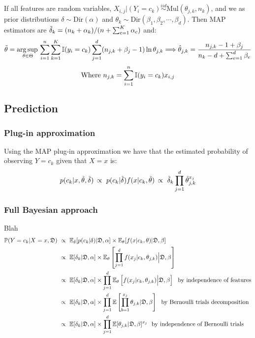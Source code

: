 If all features are  random variables, $X_{i,j}|(Y_i=c_k)\overset{iid}{\sim}\text{Mul}(\theta_{j,k},n_k)$, and we as prior distributions $\delta\sim\text{Dir}(\alpha)$ and $\theta_k\sim\text{Dir}(\beta_1,\beta_2,\cdots,\beta_d)$. Then MAP estimators are $\Tilde{\delta}_k = (n_k+\alpha_k)/(n+\sum_{c=1}^K\alpha_c)$ and:
\begin{equation*}
    \Tilde{\theta} = \operatorname*{arg\,sup\,}_{\theta\in\Theta}  \sum_{i=1}^n\sum_{k=1}^K\operatorname{\mathbb{I}}(y_i=c_k)\sum_{j=1}^d(n_{j,k}+\beta_j-1)\ln \theta_{j,k} \Longrightarrow \hat{\theta}_{j,k} = \frac{n_{j,k}-1+\beta_j}{n_k-d+\sum_{e=1}^d\beta_e}
\end{equation*}
\begin{equation*}
    \text{Where } n_{j,k}=\sum_{i=1}^n\operatorname{\mathbb{I}}(y_i=c_k)x_{i,j}
\end{equation*}

\subsection{Prediction}

\subsubsection*{Plug-in approximation}
Using the MAP plug-in approximation we have that the estimated probability of observing $Y=c_k$ given that $X=x$ is:
\begin{equation*}
    p(c_k|x, \Tilde{\theta},\Tilde{\delta})\, \propto\ p(c_k|\Tilde{\delta})f(x|c_k,\Tilde{\theta})\, \propto\  \Tilde{\delta}_k\prod_{j=1}^d \Tilde{\theta}_{j,k}^{x_j}
\end{equation*}


\subsubsection*{Full Bayesian approach}

Blah
\begin{align*}
    \operatorname{\mathbb{P}}(Y=c_k|X =x,\mathfrak{D})\
    &\propto\ \operatorname{\mathbb{E}}_{\delta}[p(c_k|\delta)|\mathfrak{D},\alpha]\times \operatorname{\mathbb{E}}_{\theta}[f(x|c_k,\theta)|\mathfrak{D},\beta] \\
    &\propto\ \operatorname{\mathbb{E}} [\delta_k|\mathfrak{D},\alpha] \times \operatorname{\mathbb{E}}_{\theta}\left[\prod_{j=1}^d  f(x_j|c_k,\theta_{j,k}) \Big|\mathfrak{D},\beta\right]\\
    &\propto\ \operatorname{\mathbb{E}} [\delta_k|\mathfrak{D},\alpha] \times \prod_{j=1}^d\operatorname{\mathbb{E}}_{\theta}\left[  f(x_j|c_k,\theta_{j,k}) \Big|\mathfrak{D},\beta\right]\ \text{ by independence of features} \\
    &\propto\ \operatorname{\mathbb{E}} [\delta_k|\mathfrak{D},\alpha]\times\prod_{j=1}^d \operatorname{\mathbb{E}} \left[\prod_{b=1}^{x_j}\theta_{j,k}|\mathfrak{D},\beta\right]\ \text{ by Bernoulli trials decomposition}\\
    &\propto\ \operatorname{\mathbb{E}} [\delta_k|\mathfrak{D},\alpha]\times\prod_{j=1}^d \operatorname{\mathbb{E}} [\theta_{j,k}|\mathfrak{D},\beta]^{x_j}\ \text{ by independence of Bernoulli trials}
\end{align*}

